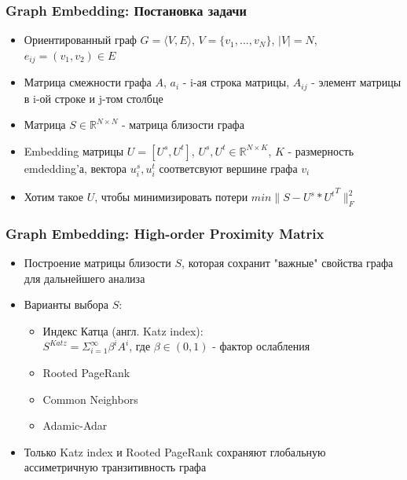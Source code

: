 \documentclass[xcolor=table,english]{beamer}
\begin{document}
\begin{frame}[fragile] \frametitle{Graph Embedding: Постановка задачи}
    \begin{itemize}
        \item Ориентированный граф $G = \langle V, E \rangle$, $V = \{ v_1, ... , v_N \}$, $|V| = N$, $e_{ij}=(v_1, v_2) \in E$
        \item Матрица смежности графа $A$, $a_i$ - i-ая строка матрицы, $A_{ij}$ - элемент матрицы в i-ой строке и j-том столбце
        \item Матрица $S \in \mathbb{R}^{N \times N}$ - матрица близости графа
        \item Embedding матрицы $U = [U^s, U^t]$, $U^s, U^t \in \mathbb{R}^{N \times K}$, $K$ - размерность emdedding'а, вектора $u^s_i, u^t_i$ соответсвуют вершине графа $v_i$
        \item Хотим такое $U$, чтобы минимизировать потери $min \| S - U^s * {U^t}^T \|^2_F$ 
    \end{itemize}
\end{frame}

\begin{frame}[fragile] \frametitle{Graph Embedding: High-order Proximity Matrix}
    \begin{itemize}
        \item Построение матрицы близости $S$, которая сохранит "важные" свойства графа для дальнейшего анализа
        \item Варианты выбора $S$:
        {
            \begin{itemize}
                \item Индекс Катца (англ. Katz index): \\$S^{Katz} = \Sigma_{i=1}^{\infty} \beta^i A^i$, где $\beta \in (0, 1)$ - фактор ослабления
                \item Rooted PageRank
                \item Common Neighbors
                \item Adamic-Adar
            \end{itemize}
        }
        \item Только Katz index и Rooted PageRank сохраняют глобальную ассиметричную транзитивность графа
    \end{itemize}
\end{frame}
\end{document}

